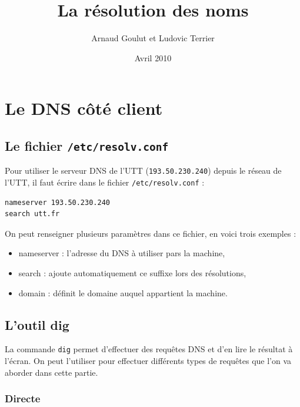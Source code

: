 \documentclass[12pt,a4paper,notitlepage]{article}
\begin{document}
\title{La résolution des noms}
\author{Arnaud Goulut et Ludovic Terrier}
\date{Avril 2010}
\maketitle



\thispagestyle{empty}




\section{Le DNS côté client}

\subsection{Le fichier \texttt{/etc/resolv.conf}}
Pour utiliser le serveur DNS de l'UTT (\texttt{193.50.230.240}) depuis le réseau de l'UTT, il faut écrire dans le fichier \texttt{/etc/resolv.conf} : \\

\begin{lstlisting}[title=Contenu du fichier resolv.conf]
nameserver 193.50.230.240
search utt.fr
\end{lstlisting}

\bigskip
On peut renseigner plusieurs paramètres dans ce fichier, en voici trois exemples :
\begin{itemize}
\item nameserver : l'adresse du DNS à utiliser pars la machine,
\item search : ajoute automatiquement ce suffixe lors des résolutions,
\item domain : définit le domaine auquel appartient la machine.
\end{itemize}


\subsection{L'outil dig}
La commande \texttt{dig} permet d'effectuer des requêtes DNS et d'en lire le résultat à l'écran. On peut l'utiliser pour effectuer différents types de requêtes que l'on va aborder dans cette partie.

\subsubsection{Directe}
\end{document}
